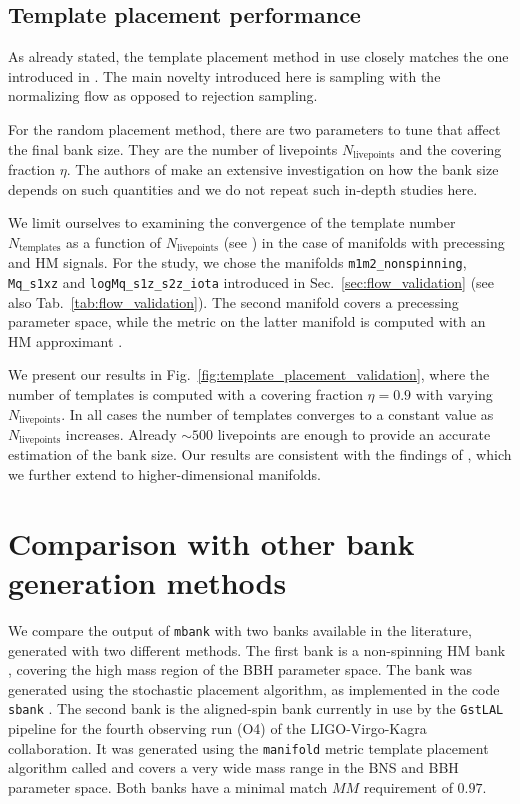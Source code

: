 \documentclass[twocolumn,showpacs,preprintnumbers,nofootinbib,prd,
superscriptaddress,10pt]{revtex4-2}
\begin{document}
\subsection{Template placement performance} \label{sec:template_placement}

As already stated, the template placement method in use closely matches the one introduced in \cite{Coogan:2022qxs}.
The main novelty introduced here is sampling with the normalizing flow as opposed to rejection sampling.

For the random placement method, there are two parameters to tune that affect the final bank size. They are the number of livepoints $N_\text{livepoints}$ and the covering fraction $\eta$.
The authors of \cite{Coogan:2022qxs} make an extensive investigation on how the bank size depends on such quantities and we do not repeat such in-depth studies here.

We limit ourselves to examining the convergence of the template number $N_\text{templates}$ as a function of $N_\text{livepoints}$ (see \cite[Fig.~4 (right)]{Coogan:2022qxs}) in the case of manifolds with precessing and HM signals.
For the study, we chose the manifolds \texttt{m1m2\_nonspinning}, \texttt{Mq\_s1xz} and \texttt{logMq\_s1z\_s2z\_iota} introduced in Sec.~\ref{sec:flow_validation} (see also Tab.~\ref{tab:flow_validation}). The second manifold covers a precessing parameter space, while the metric on the latter manifold is computed with an HM approximant \cite{Garcia-Quiros:2020qpx}.

We present our results in Fig.~\ref{fig:template_placement_validation}, where the number of templates is computed with a covering fraction $\eta = 0.9$ with varying $N_\text{livepoints}$.
In all cases the number of templates converges to a constant value as $N_\text{livepoints}$ increases. Already $\sim 500$ livepoints are enough to provide an accurate estimation of the bank size.
Our results are consistent with the findings of \cite{Coogan:2022qxs}, which we further extend to higher-dimensional manifolds.

\section{Comparison with other bank generation methods} \label{sec:other_methods}

We compare the output of \texttt{mbank} with two banks available in the literature, generated with two different methods.
The first bank is a non-spinning HM bank \cite{Harry:2017weg}, covering the high mass region of the BBH parameter space. The bank was generated using the stochastic placement algorithm, as implemented in the code \texttt{sbank} \cite{Ajith:2012mn}.
The second bank is the aligned-spin bank \cite{Sakon:2022ibh} currently in use by the \texttt{GstLAL} pipeline \cite{PhysRevD.95.042001, gstlal_paper2} for the fourth observing run (O4) of the LIGO-Virgo-Kagra collaboration. It was generated using the \texttt{manifold} \cite{Hanna:2022zpk} metric template placement algorithm called and covers a very wide mass range in the BNS and BBH parameter space.
Both banks have a minimal match $MM$ requirement of $0.97$.
\end{document}

